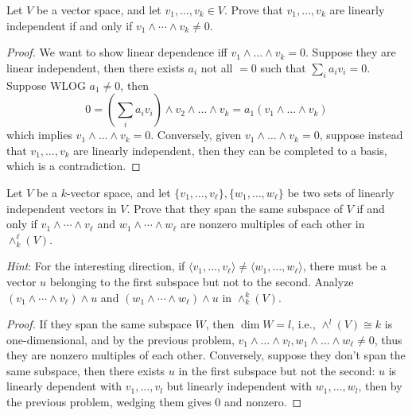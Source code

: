 \documentclass[openany]{book}
\newcommand{\lambdaprod}{\wedge} %
\begin{document}
    
    \begin{prob}[4.6]
    Let \(V\) be a vector space, and let \(v_1, \ldots, v_k \in V\). Prove that \(v_1, \ldots, v_k\) are linearly independent if and only if \(v_1 \lambdaprod \cdots \lambdaprod v_k\neq 0\).
    \end{prob}
    \begin{proof}
        We want to show linear dependence iff $v_1\wedge\dots\wedge v_k=0$. Suppose they are linear independent, then there exists $a_i$ not all $=0$ such that $\sum_ia_iv_i=0$. Suppose WLOG $a_1\neq 0$, then
        \begin{equation*}
            0=\left(\sum_ia_iv_i\right)\wedge v_2\wedge\dots\wedge v_k=a_1 (v_1\wedge\dots\wedge v_k)
        \end{equation*}
        which implies $v_1\wedge\dots\wedge v_k=0$. Conversely, given $v_1\wedge\dots\wedge v_k=0$, suppose instead that $v_1,\dots, v_k$ are linearly independent, then they can be completed to a basis, which is a contradiction.
    \end{proof}


    
    \begin{prob}[4.7]
    Let \(V\) be a \(k\)-vector space, and let \(\{v_1, \ldots, v_\ell\}, \{w_1, \ldots, w_\ell\}\) be two sets of linearly independent vectors in \(V\). Prove that they span the same subspace of \(V\) if and only if \(v_1 \lambdaprod \cdots \lambdaprod v_\ell\) and \(w_1 \lambdaprod \cdots \lambdaprod w_\ell\) are nonzero multiples of each other in \(\lambdaprod^\ell_k(V)\). 
    
    \textit{Hint}: For the interesting direction, if \(\langle v_1, \ldots, v_\ell \rangle \neq \langle w_1, \ldots, w_\ell \rangle\), there must be a vector \(u\) belonging to the first subspace but not to the second. Analyze \((v_1 \lambdaprod \cdots \lambdaprod v_\ell) \lambdaprod u\) and \((w_1 \lambdaprod \cdots \lambdaprod w_\ell) \lambdaprod u\) in \(\lambdaprod^k_k(V)\). 
    \end{prob}
    \begin{proof}
        If they span the same subspace $W$, then $\dim W=l$, i.e., $\wedge^l(V)\cong k$ is one-dimensional, and by the previous problem, $v_1\wedge\dots\wedge v_l, w_1\wedge\dots\wedge w_\ell\neq 0$, thus they are nonzero multiples of each other. Conversely, suppose they don't span the same subspace, then there exists $u$ in the first subspace but not the second: $u$ is linearly dependent with $v_1,\dots, v_l$ but linearly independent with $w_1,\dots, w_l$, then by the previous problem, wedging them gives $0$ and nonzero.
    \end{proof}
\end{document}
